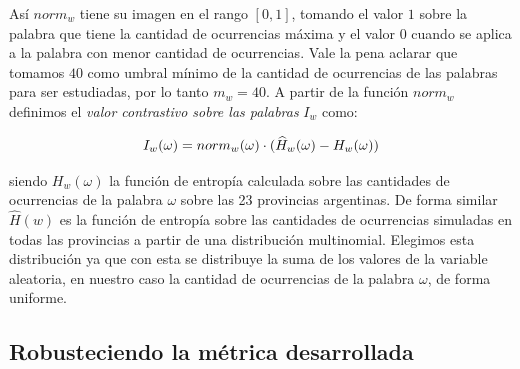 




Así $norm_w$ tiene su imagen en el rango $[0,1]$, tomando el valor $1$ sobre la palabra que tiene la cantidad de ocurrencias máxima y el valor $0$ cuando se aplica a la palabra con menor cantidad de ocurrencias. Vale la pena aclarar que tomamos $40$ como umbral mínimo de la cantidad de ocurrencias de las palabras para ser estudiadas, por lo tanto $m_w = 40 $.
A partir de la función $norm_w$ definimos el \textit{valor contrastivo sobre las palabras} $I_w$ como:

\begin{equation}
I_w(\omega) = norm_{w}(\omega) \cdot (\widehat{H}_{w}(\omega) - H_{w}(\omega)) \\
\label{eq:iw}
\end{equation}

siendo $H_w(\omega)$ la función de entropía calculada sobre las cantidades de ocurrencias de la palabra $\omega$ sobre las 23 provincias argentinas. De forma similar $\widehat{H}(w)$ es la función de entropía sobre las cantidades de ocurrencias simuladas en todas las provincias a partir de una distribución multinomial. Elegimos esta distribución ya que con esta se distribuye la suma de los valores de la variable aleatoria, en nuestro caso la cantidad de ocurrencias de la palabra $\omega$, de forma uniforme.%

\subsection{Robusteciendo la métrica desarrollada}

